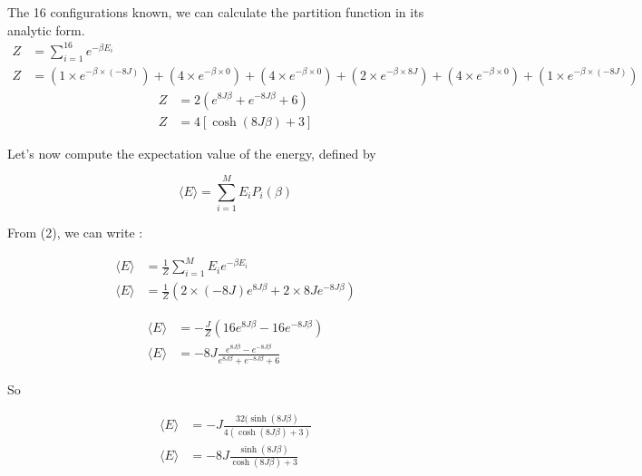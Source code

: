 \documentclass[a4paper, twoside, 11pt]{report}
\theoremstyle{theorem}
\theoremstyle{remark}
\theoremstyle{exemple}
\begin{document}
            The 16 configurations known, we can calculate the partition function in its analytic form. 
                \begin{align*}
                    Z &= \sum\limits_{i=1}^{16}e^{-\beta E_i} \\
                    Z &= (1 \times e^{-\beta \times (-8J)}) + (4 \times e^{-\beta \times 0}) + (4 \times e^{-\beta \times 0}) + (2 \times e^{-\beta \times 8J}) + (4 \times e^{-\beta \times 0}) + (1 \times e^{-\beta \times (-8J)})        
                \end{align*}
                \begin{align*}
                    Z &= 2(e^{8J\beta} + e^{-8J\beta} + 6) \tag{4}\\
                    Z &= 4[\cosh(8J\beta) + 3] \tag{4'}
                \end{align*}
                
            Let's now compute the expectation value of the energy, defined by
            
                \begin{equation*}
                    \langle E \rangle = \sum\limits_{i=1}^{M}E_iP_i(\beta)
                \end{equation*}            
            
            From (2), we can write :
            
                \begin{align*}
                    \langle E \rangle &= \frac{1}{Z}\sum\limits_{i=1}^{M} E_i e^{-\beta E_i} \\
                    \langle E \rangle &= \frac{1}{Z} \left(2 \times (-8J) e^{8J\beta} + 2 \times 8J e^{-8J\beta}\right)
                \end{align*}             
            
                \begin{align*}
                    \langle E \rangle &= - \frac{J}{Z}\left( 16 e^{8J\beta} - 16 e^{-8J\beta} \right) \tag{5} \\
                    \langle E \rangle &= -8J \frac{e^{8J\beta} - e^{-8J\beta}}{e^{8J\beta} + e^{-8J\beta} + 6}
                \end{align*}
                
            So
            
                \begin{align*}
                    \langle E \rangle &= -J \frac{32(\sinh (8J\beta)}{4(\cosh (8J\beta) + 3)} \\ 
                    \langle E \rangle &= -8J \frac{\sinh (8J\beta)}{\cosh (8J\beta) + 3}  \tag{5'}
                \end{align*}
            
\end{document}
